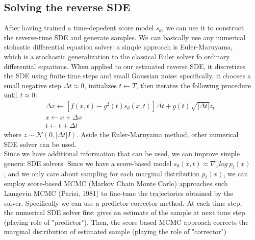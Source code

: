 \documentclass{article}
\begin{document}
	 \subsection{Solving the reverse SDE}
	 After having trained a time-depedent score model $s_{\theta}$, we can use it to construct the reverse-time SDE and generate samples. We can basically use any numerical stohastic differential equation solver: a simple approach is Euler-Maruyama, which is a stochastic generalization to the classical Euler solver fo ordinary differential equations. When applied to our estimated reverse SDE, it discretizes the SDE using finite time steps and small Gaussian noise: specifically, it chooses a small negative step $\Delta t \approx 0$, initializes $t \leftarrow T$, then iterates the following procedure until $t \approx 0$:
	 \begin{equation} \begin{split}
	 &\Delta x \leftarrow [f(x,t) - g^2(t)s_{\theta}(x,t)] \Delta t + g(t) \sqrt{|\Delta t|}z_{t} \\
	 &x \leftarrow x+ \Delta x \\
	 &t \leftarrow t+ \Delta t
	 \end{split} \end{equation}
	 where $z \sim \mathcal{N}(0, |\Delta t| I)$.
	 Aside the Euler-Maruyama method, other numerical SDE solver can be used.\\
	 \newline
	 Since we have additional information that can be used, we can improve simple generic SDE solvers. Since we have a score-based model $s_{\theta}(x,t) \approx \nabla_{x} log\ p_{t}(x)$, and we only care about sampling for each marginal distribution $p_{t}(x)$, we can employ score-based MCMC (Markov Chain Monte Carlo) approaches such Langevin MCMC (Parisi, 1981) to fine-tune the trajectories obtained by the solver. Specifically we can use a predictor-corrector method. At each time step, the numerical SDE solver first gives an estimate of the sample at next time step (playing role of "predictor"). Then, the score based MCMC approach corrects the marginal distribution of estimated sample (playing the role of "corrector")
\end{document}
